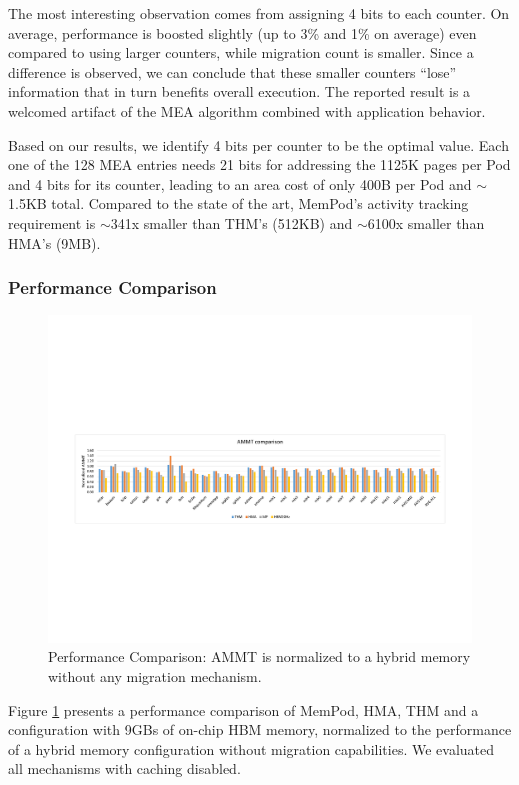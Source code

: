 The most interesting observation comes from assigning 4 bits to each counter. On average, performance is boosted slightly (up to 3\% and 1\% on average) even compared to using larger counters, while migration count is smaller. Since a difference is observed, we can conclude that these smaller counters ``lose'' information that in turn benefits overall execution. The reported result is a welcomed artifact of the MEA algorithm combined with application behavior. 

Based on our results, we identify 4 bits per counter to be the optimal value. Each one of the 128 MEA entries needs 21 bits for addressing the 1125K pages per Pod and 4 bits for its counter, leading to an area cost of only 400B per Pod and $\sim$1.5KB total. Compared to the state of the art, MemPod's activity tracking requirement is $\sim$341x smaller than THM's (512KB) and $\sim$6100x smaller than HMA's (9MB).


\subsubsection{Performance Comparison}
\label{sub:performance}

\begin{figure}[t]
  \includegraphics[width=\textwidth]{figures/performance_over_nlm.pdf}
  \caption{Performance Comparison: AMMT is normalized to a hybrid memory without any migration mechanism.}
  \label{fig:performance}
\end{figure}

Figure \ref{fig:performance} presents a performance comparison of MemPod, HMA, THM and a configuration with 9GBs of on-chip HBM memory, normalized to the performance of a hybrid memory configuration without migration capabilities. We evaluated all mechanisms with caching disabled. 

